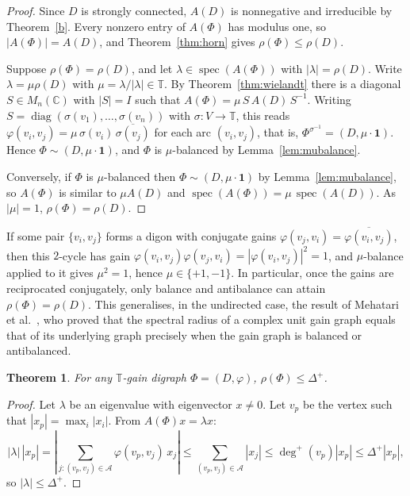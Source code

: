 \documentclass[12pt]{article}
\newtheorem{theorem}{Theorem}[section]
\theoremstyle{definition}
\DeclareMathOperator{\spec}{spec}
\newcommand{\TT}{\mathbb{T}}
\newcommand{\CC}{\mathbb{C}}
\newcommand{\vp}{\varphi}
\begin{document}

\begin{proof}
Since $D$ is strongly connected, $A(D)$ is nonnegative and irreducible
by Theorem~\ref{b}. Every nonzero entry of $A(\Phi)$ has modulus one,
so $|A(\Phi)|=A(D)$, and Theorem~\ref{thm:horn} gives
$\rho(\Phi)\le\rho(D)$.

Suppose $\rho(\Phi)=\rho(D)$, and let $\lambda\in\spec(A(\Phi))$ with
$|\lambda|=\rho(D)$. Write $\lambda=\mu\rho(D)$ with
$\mu=\lambda/|\lambda|\in\TT$. By
Theorem~\ref{thm:wielandt} there is a diagonal $S\in M_n(\CC)$ with
$|S|=I$ such that $A(\Phi)=\mu\,S\,A(D)\,S^{-1}$. Writing
$S=\operatorname{diag}(\sigma(v_1),\dots,\sigma(v_n))$ with
$\sigma\colon V\to\TT$, this reads
$\varphi(v_i,v_j)=\mu\,\sigma(v_i)\,\overline{\sigma(v_j)}$ for each
arc $(v_i,v_j)$, that is, $\Phi^{\sigma^{-1}}=(D,\mu\cdot\mathbf 1)$.
Hence $\Phi\sim(D,\mu\cdot\mathbf 1)$, and $\Phi$ is $\mu$-balanced by
Lemma~\ref{lem:mubalance}.

Conversely, if $\Phi$ is $\mu$-balanced then
$\Phi\sim(D,\mu\cdot\mathbf 1)$ by Lemma~\ref{lem:mubalance}, so
$A(\Phi)$ is similar to $\mu A(D)$ and
$\spec(A(\Phi))=\mu\,\spec(A(D))$. As $|\mu|=1$, $\rho(\Phi)=\rho(D)$.
\end{proof}

If some pair $\{v_i,v_j\}$ forms a digon with conjugate gains
$\vp(v_j,v_i)=\overline{\vp(v_i,v_j)}$, then this $2$-cycle has gain
$\vp(v_i,v_j)\vp(v_j,v_i)=|\vp(v_i,v_j)|^2=1$, and $\mu$-balance applied to it gives $\mu^{2}=1$, hence $\mu\in\{+1,-1\}$. In particular, once the gains are reciprocated conjugately, only balance and antibalance can attain $\rho(\Phi)=\rho(D)$. This generalises, in the undirected case, the result of Mehatari et al.~\cite{Mehatari2022}, who proved that the spectral radius of a complex unit gain graph equals that of its underlying graph precisely when the gain graph is balanced or antibalanced.

\begin{theorem}\label{them:upp}
  \label{thm:geom-bound}
  For any $\TT$-gain digraph $\Phi=(D,\vp)$, $\rho(\Phi) \leq \Delta^+$.
\end{theorem}

  \begin{proof}
  Let $\lambda$ be an eigenvalue with eigenvector $x \neq 0$.
  Let $v_p$ be the vertex such that $|x_p| = \max_i|x_i|$.
  From $A(\Phi)x = \lambda x$:
  \[
    |\lambda|\,|x_p|
    = \left|\sum_{j:(v_p,v_j)\in \mathcal{A}}\vp(v_p,v_j)\,x_j\right|
    \leq \sum_{(v_p,v_j)\in \mathcal{A}}|x_j|
    \leq \deg^+(v_p)|x_p|
    \leq \Delta^+|x_p|,
  \]
  so $|\lambda|\leq\Delta^+$. 
  \end{proof}
  
\end{document}
